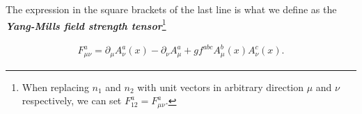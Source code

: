 \documentclass{article}
\newcommand\numberthis{\addtocounter{equation}{1}\tag{\theequation}}
\theoremstyle{plain} %
\theoremstyle{convention} %
\theoremstyle{remark} %
\def\df#1{\textbf{\textit{#1}}}
\numberwithin{equation}{section}
\begin{document}

The expression in the square brackets of the last line is what we define as the \df{Yang-Mills field strength tensor}\footnote{When replacing $n_1$ and $n_2$ with unit vectors in arbitrary direction $\mu$ and $\nu$ respectively, we can set $F_{12}^a = F_{\mu \nu}^a$.}

\begin{align}
    F_{\mu \nu}^a = \partial_{\mu} A_{\nu}^a(x) - \partial_{\nu} A_{\mu}^a + g f^{abc} A_{\mu}^b(x) A_{\nu}^c(x). \label{eq:ymtensor}
\end{align}
\end{document}
